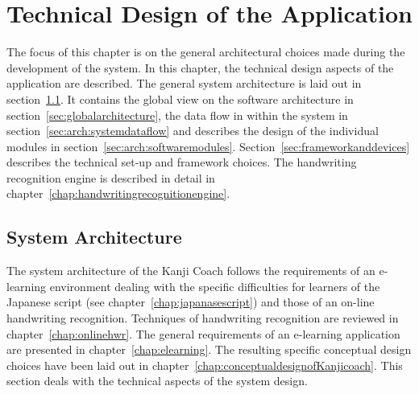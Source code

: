 
\chapter{Technical Design of the Application}
\label{chap:technicaldesign}




The focus of this chapter is on the general architectural choices made during
the development of the system. In this chapter, the technical design aspects 
of the application are described. The general system architecture is laid out in
section~\ref{sec:systemarchitecture}. It contains the global view on the software
architecture in section~\ref{sec:globalarchitecture}, the data flow in within
the system in section~\ref{sec:arch:systemdataflow} and describes the design
of the individual modules in section~\ref{sec:arch:softwaremodules}.
Section~\ref{sec:frameworkanddevices} describes the technical set-up and 
framework choices. The handwriting recognition engine is described 
in detail in chapter~\ref{chap:handwritingrecognitionengine}.

\section{System Architecture}
\label{sec:systemarchitecture}

The system architecture of the Kanji Coach follows the requirements of an 
e-learning environment dealing with the specific difficulties for learners 
of the Japanese script (see chapter~\ref{chap:japanasescript}) and those of an 
on-line handwriting recognition. Techniques of handwriting recognition are 
reviewed in chapter~\ref{chap:onlinehwr}. The general requirements of an 
e-learning application are presented in chapter~\ref{chap:elearning}. 
The resulting specific conceptual design choices have been 
laid out in chapter~\ref{chap:conceptualdesignofKanjicoach}. This
section deals with the technical aspects of the system design.

